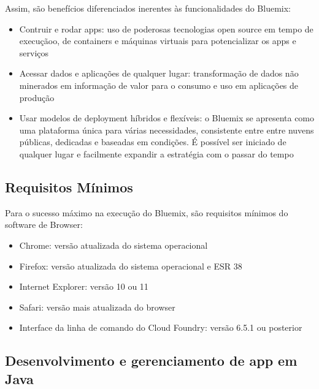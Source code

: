 Assim, são benefícios diferenciados inerentes às funcionalidades do Bluemix:
\begin{itemize}
    \item	Contruir e rodar apps: uso de poderosas tecnologias open source em tempo de execuçãoo, de containers e máquinas virtuais para potencializar os apps e serviços
    \item	Acessar dados e aplicações de qualquer lugar: transformação de dados não minerados em informação de valor para o consumo e uso em aplicações de produção
    \item	Usar modelos de deployment híbridos e flexíveis: o Bluemix se apresenta como uma plataforma única para várias necessidades, consistente entre entre nuvens públicas, dedicadas e baseadas em condições. É possível ser iniciado de qualquer lugar e facilmente expandir a estratégia com o passar do tempo
\end{itemize}

\subsection{Requisitos Mínimos}

Para o sucesso máximo na execução do Bluemix, são requisitos mínimos do software de Browser:
\begin{itemize}
    \item	Chrome: versão atualizada do sistema operacional
    \item	Firefox: versão atualizada do sistema operacional e ESR 38
    \item	Internet Explorer: versão 10 ou 11
    \item	Safari: versão mais atualizada do browser
    \item	Interface da linha de comando do Cloud Foundry: versão 6.5.1 ou posterior
\end{itemize}

\subsection{Desenvolvimento e gerenciamento de app em Java}

